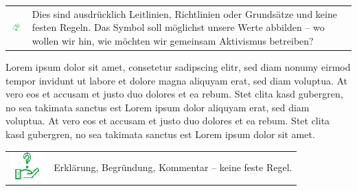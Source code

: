 \documentclass[a4paper,
  ]{scrartcl}
\newcommand{\announcement}[1]{%
\begin{tabularx}{\textwidth}{p{1.5cm}X}
\centering\includegraphics[width=1.5cm]{Lautsprecher.png} & #1 \\
\end{tabularx}
}
\newcommand{\hint}[1]{%
\begin{tabularx}{\textwidth}{p{1.5cm}X}
\centering\includegraphics[width=1.3cm]{Fragezeichen-Hand.png} & #1 \\
\end{tabularx}
}
\begin{document}
\announcement{Dies sind ausdrücklich Leitlinien, Richtlinien oder Grundsätze und keine festen Regeln. Das Symbol soll möglichst unsere Werte abbilden – wo wollen wir hin, wie möchten wir gemeinsam Aktivismus betreiben?}
Lorem ipsum dolor sit amet, consetetur sadipscing elitr, sed diam nonumy eirmod tempor invidunt ut labore et dolore magna aliquyam erat, sed diam voluptua. At vero eos et accusam et justo duo dolores et ea rebum. Stet clita kasd gubergren, no sea takimata sanctus est Lorem ipsum dolor aliquyam erat, sed diam voluptua. At vero eos et accusam et justo duo dolores et ea rebum. Stet clita kasd gubergren, no sea takimata sanctus est Lorem ipsum dolor sit amet.

\hint{Erklärung, Begründung, Kommentar – keine feste Regel.}
\end{document}

